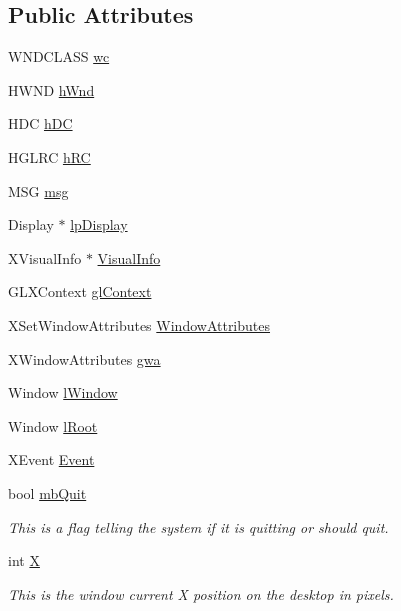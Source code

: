 \subsection*{Public Attributes}
\begin{DoxyCompactItemize}
\item 
WNDCLASS \hyperlink{classc_window_a43d5d7dc391f22c2710cbdc6a7cf0636}{wc}
\item 
HWND \hyperlink{classc_window_a5a92dcb33f9265f928a072bd697ee183}{hWnd}
\item 
HDC \hyperlink{classc_window_a0be2237675821132fbd3f04711680aa6}{hDC}
\item 
HGLRC \hyperlink{classc_window_ad024922891b97efb71adae9ff347eb25}{hRC}
\item 
MSG \hyperlink{classc_window_a38385e784656f1875585e6cc4dc1fee4}{msg}
\item 
Display $\ast$ \hyperlink{classc_window_ab092a4b04f6335f9244e03442abebad9}{lpDisplay}
\item 
XVisualInfo $\ast$ \hyperlink{classc_window_a3baae479c64be51ef0c3ca85064d8a02}{VisualInfo}
\item 
GLXContext \hyperlink{classc_window_a02f6fffcec5cc04c13eb2f21d7587afd}{glContext}
\item 
XSetWindowAttributes \hyperlink{classc_window_a0c4adb22e5c6fb4d76dde8675f54d92e}{WindowAttributes}
\item 
XWindowAttributes \hyperlink{classc_window_a725ac4f4be7f80ef0a4bc7e2b087d025}{gwa}
\item 
Window \hyperlink{classc_window_a56887fef3b2681690454e823ce0c7f00}{lWindow}
\item 
Window \hyperlink{classc_window_a38f6eae4c48516c8528bbcd121401281}{lRoot}
\item 
XEvent \hyperlink{classc_window_a7c80cc6152a4d9721a58d2e08cb756b9}{Event}
\item 
bool \hyperlink{classc_window_a30b82d1c8cbe509a8c65143aba4a268d}{mbQuit}
\begin{DoxyCompactList}\small\item\em This is a flag telling the system if it is quitting or should quit. \item\end{DoxyCompactList}\item 
int \hyperlink{classc_window_a0d94ec5d7fc9eca768ae27437a676ef6}{X}
\begin{DoxyCompactList}\small\item\em This is the window current X position on the desktop in pixels. \item\end{DoxyCompactList}\item 

\end{DoxyCompactItemize}
